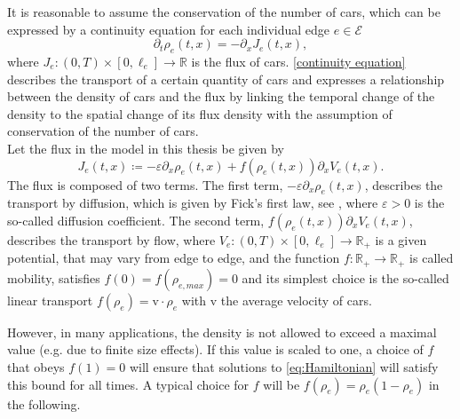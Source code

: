 It is reasonable to assume the conservation of the number of cars, which can be expressed by a continuity equation for each individual edge $e \in \mathcal{E}$
\begin{equation}
    \label{continuity equation}
    \partial_t \rho_e (t,x) = - \partial_x J_e(t,x),
\end{equation}
where $J_e \colon (0,T) \times [0, \ell_e] \to \mathbb{R}$ is the flux of cars. \cref{continuity equation} describes the transport of a certain quantity of cars and expresses a relationship between the density of cars and the flux by linking the temporal change of the density to the spatial change of its flux density with the assumption of conservation of the number of cars. \\
Let the flux in the model in this thesis be given by 
\begin{equation} 
    \label{eq:flux} 
    J_e(t,x) \coloneqq - \varepsilon \partial_x \rho_e (t, x) + f(\rho_e(t, x)) \partial_x V_e(t, x).
\end{equation}
The flux is composed of two terms. The first term, $- \varepsilon \partial_x \rho_e (t, x)$, describes the transport by diffusion, which is given by Fick's first law, see \cite{Fick:1855}, where $\varepsilon > 0$ is the so-called diffusion coefficient. The second term, $f(\rho_e(t, x)) \partial_x V_e(t, x)$, describes the transport by flow, where $V_e \colon (0,T) \times [0, \ell_e] \to \mathbb{R}_{+}$ is a given potential, that may vary from edge to edge, and the function $f \colon \mathbb{R}_{+} \to \mathbb{R}_{+}$ is called mobility, satisfies $f(0) = f(\rho_{e, max}) = 0$ and its simplest choice is the so-called linear transport $f(\rho_e) = \mathrm{v} \cdot \rho_e$ with $\mathrm{v}$ the average velocity of cars. 

However, in many applications, the density is not allowed to exceed a maximal value (e.g. due to finite size effects). If this value is scaled to one, a choice of $f$ that obeys $f(1) = 0$ will ensure that solutions to \eqref{eq:Hamiltonian} will satisfy this bound for all times. A typical choice for $f$ will be $f(\rho_e) = \rho_e(1-\rho_e)$ in the following.



% 


